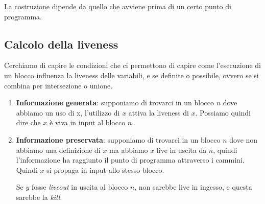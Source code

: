 La costruzione dipende da quello che avviene prima di un certo punto di programma.
\subsection{Calcolo della liveness}
Cerchiamo di capire le condizioni che ci permettono di capire come l'esecuzione 
di un blocco influenza la liveness delle variabili, e se definite o possibile,
ovvero se si combina per intersezione o unione.
\begin{enumerate}
    
    \item \textbf{Informazione generata}: supponiamo di trovarci in un blocco $n$ dove abbiamo un uso di 
    x, l'utilizzo di $x$ attiva la liveness di $x$. Possiamo quindi dire che 
    $x$ è viva in input al blocco $n$.
    
    \begin{figure}[H]
        \centering
    \end{figure}

    \item \textbf{Informazione preservata}: supponiamo di trovarci in un blocco $n$ dove non abbiamo una definizione di
    $x$ ma abbiamo $x$ live in uscita da $n$, quindi l'informazione 
    ha raggiunto il punto di programma attraverso i cammini. Quindi 
    $x$ si propaga in input allo stesso blocco.

    Se $y$ fosse \textit{liveout} in uscita al blocco $n$, non sarebbe 
    live in ingesso, e questa sarebbe la \textit{kill}.
    
    \begin{figure}[H]
        \centering
\end{figure}
\end{enumerate}
